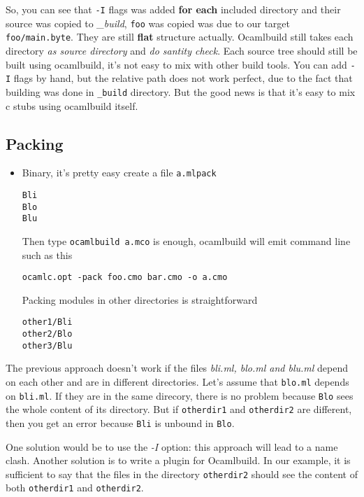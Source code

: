 \documentclass[11pt]{article}
\begin{document}
   So, you can see that \texttt{-I} flags was added \textbf{for each} included
   directory and their source was copied to \emph{_build}, \texttt{foo} was copied
   was due to our target \texttt{foo/main.byte}. They are still \textbf{flat}
   structure actually. Ocamlbuild still takes each directory \emph{as    source directory} and \emph{do santity check}. Each source tree should
   still be built using ocamlbuild, it's not easy to mix with other
   build tools. You can add \texttt{-I} flags by hand, but the relative path
   does not work perfect, due to the fact that building was done in
   \texttt{\_build} directory. But the good news is that it's easy to mix c
   stubs using ocamlbuild itself.
\subsection*{Packing}
\label{sec-1-4}

\begin{itemize}
\item Binary, it's pretty easy
     create a file \texttt{a.mlpack}


\begin{verbatim}
Bli
Blo
Blu
\end{verbatim}
     
     Then type \texttt{ocamlbuild a.mco} is enough, ocamlbuild will emit
     command line such as this
     

\begin{verbatim}
ocamlc.opt -pack foo.cmo bar.cmo -o a.cmo
\end{verbatim}
     
     Packing modules in other directories is straightforward


\begin{verbatim}
other1/Bli
other2/Blo
other3/Blu
\end{verbatim}
\end{itemize}

   
   The previous approach doesn't work if the files \emph{bli.ml, blo.ml and    blu.ml} depend on each other and are in different
   directories. Let's assume that \texttt{blo.ml} depends on \texttt{bli.ml}. If
   they are in the same direcory, there is no problem because \texttt{Blo}
   sees the whole content of its directory. But if \texttt{otherdir1} and
   \texttt{otherdir2} are different, then you get an error because \texttt{Bli} is
   unbound in \texttt{Blo}.


   One solution would be to use the \emph{-I} option: this approach will
   lead to a name clash.  Another solution is to write a plugin for
   Ocamlbuild. In our example, it is sufficient to say that the files
   in the directory \texttt{otherdir2} should see the content of both \texttt{otherdir1}
   and \texttt{otherdir2}.
\end{document}
